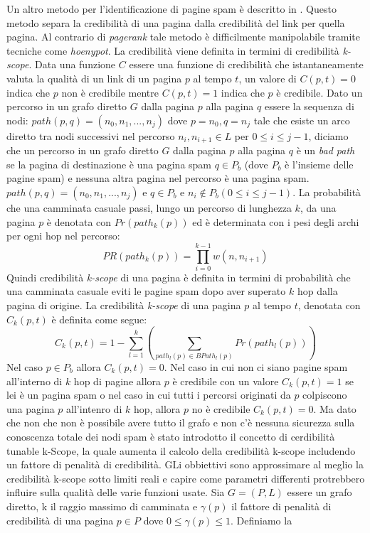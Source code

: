 Un altro metodo per l'identificazione di pagine spam è descritto in \cite{Caverlee:2007:CWS:1281100.1281124}. Questo metodo separa la credibilità di una pagina dalla credibilità del link per quella pagina. Al contrario di \textit{pagerank} tale metodo è difficilmente manipolabile tramite tecniche come \textit{hoenypot}. La credibilità viene definita in termini di credibilità \textit{k-scope}. Data una funzione \(C\) essere una funzione di credibilità che istantaneamente valuta la qualità di un link di un pagina \(p\) al tempo \(t\), un valore di \(C(p,t)=0\) indica che \(p\) non è credibile mentre \(C(p,t)=1\) indica che \(p\) è credibile. Dato  un percorso in un grafo diretto \(G\) dalla pagina \(p\) alla pagina \(q\) essere la sequenza di nodi: \(path(p,q)=(n_0,n_1,...,n_j)\) dove \(p=n_0, q=n_j\) tale che esiste un arco diretto tra nodi successivi nel percorso \(n_i,n_{i+1}\in L\) per \(0\leq i \leq j-1\), diciamo che un percorso  in un grafo diretto \(G\) dalla pagina \(p\) alla pagina \(q\) è un \textit{
bad path} se la pagina 
di destinazione è una pagina spam \(q\in P_b\) (dove \(P_b\) è l'insieme delle pagine spam) e nessuna altra pagina nel percorso è una pagina spam. \(path(p,q)=(n_0,n_1,...,n_j)\) e \(q\in P_b\) e \(n_i\not\in P_b (0\leq i\leq j-1)\). La probabilità che una camminata casuale passi, lungo un percorso di lunghezza \(k\), da una pagina \(p\) è denotata con \(Pr(path_k(p))\) ed è determinata con i pesi degli archi per ogni hop nel percorso:
\begin{equation}
 PR(path_k(p))=\prod_{i=0}^{k-1}w(n,n_{i+1})
\end{equation}
Quindi credibilità \textit{k-scope} di una pagina  è definita in termini di probabilità che una camminata casuale eviti le pagine spam dopo aver superato \(k\) hop dalla pagina di origine. La credibilità \textit{k-scope} di una pagina \(p\) al tempo \(t\), denotata con \(C_k(p,t)\) è definita come segue:
\begin{equation}
 C_k(p,t)=1-\sum_{l=1}^k\left (\sum_{path_l(p)\in BPath_l(p)}Pr(path_l(p))\right )
\end{equation}
Nel caso \(p\in P_b\) allora \(C_k(p,t)=0\). Nel caso in cui non ci siano pagine spam all'interno di \(k\) hop di pagine allora \(p\) è credibile con un valore \(C_k(p,t)=1\) se lei è un pagina spam o nel caso in cui tutti i percorsi originati da \(p\) colpiscono una pagina \(p\) all'intenro di \(k\) hop, allora \(p\) no è credibile \(C_k(p,t)=0\). Ma dato che non che non è possibile avere tutto il grafo e non c'è nessuna sicurezza sulla conoscenza totale dei nodi spam è stato introdotto il concetto di cerdibilità tunable k-Scope, la quale aumenta il calcolo della credibilità k-scope includendo un fattore di penalità di credibilità. GLi obbiettivi sono approssimare al meglio la credibilità k-scope sotto limiti reali e capire come parametri differenti protrebbero influire sulla qualità delle varie funzioni usate. Sia \(G=(P,L)\) essere un grafo diretto, k il raggio massimo di camminata e \(\gamma(p)\) il fattore di penalità di credibilità di una pagina \(p\in P\) dove \(0\leq \gamma(p)\leq 1\). Definiamo la 
